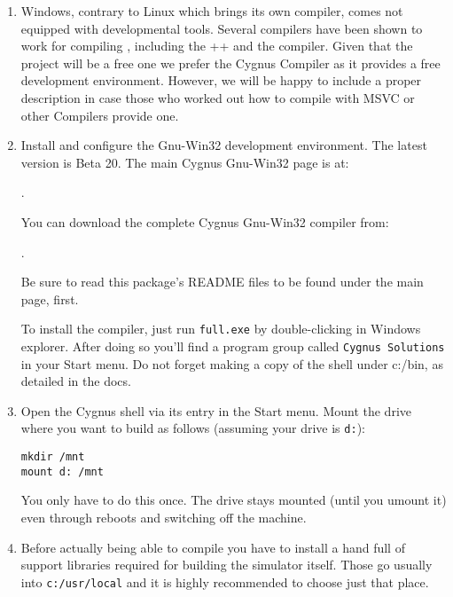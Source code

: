 \begin{enumerate}
\item Windows, contrary to Linux which brings its own compiler, comes
not equipped with developmental tools. Several compilers have been shown to work for
compiling {\FlightGear}, including the ++ and the
 compiler. Given that the project will be a free one we prefer the
Cygnus Compiler as it provides a free development environment. However, we will be happy
to include a proper description in case those who worked out how to compile with MSVC or
other Compilers provide one.

\item  Install and configure the  Gnu-Win32 development
    environment. The latest version is Beta 20. The main
    Cygnus Gnu-Win32 page is at:

        .

 \noindent
    You can download the complete Cygnus Gnu-Win32 compiler from:

        .

    Be sure to read this package's README files to be found under the main page, first.

 \noindent
    To install the compiler, just run \texttt{full.exe} by double-clicking in
    Windows explorer.  After doing so you'll find a program group called
    \texttt{Cygnus Solutions} in your Start menu. Do not forget making a copy of the
    shell under c:/bin, as detailed in the docs.

\item  Open the Cygnus shell via its entry in the Start menu.
    Mount the drive where you want to build \FlightGear as follows
    (assuming your \FlightGear drive is \texttt{d:}):

         \texttt{mkdir /mnt}\\
         \texttt{mount d: /mnt}

 \noindent
    You only have to do this once. The drive stays mounted (until you
    umount it) even through reboots and switching off the machine.


\item Before actually being able to compile \FlightGear you have to install a hand full
of support libraries required for building the simulator itself. Those go usually into
\texttt{c:/usr/local} and it is highly recommended to choose just that place.


\end{enumerate}
